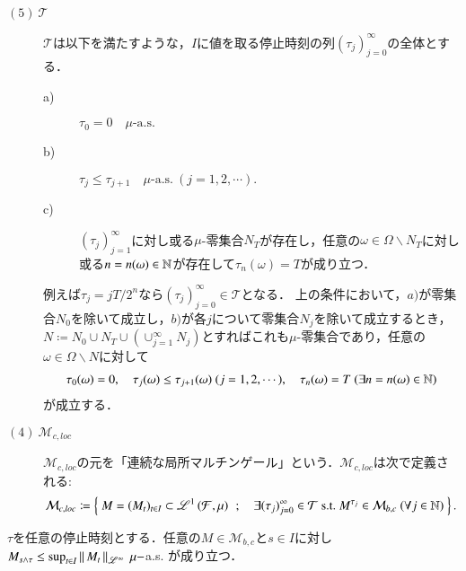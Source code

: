 \begin{description}
		\item[$\mathrm{(5)}\ \mathcal{T}$]
			$\mathcal{T}$は以下を満たすような，$I$に値を取る停止時刻の列$(\tau_j)_{j=0}^{\infty}$の全体とする．
			\begin{description}
				\item[a)] $\tau_0 = 0 \quad \mbox{$\mu$-a.s.}$
				\item[b)] $\tau_j \leq \tau_{j+1} \quad \mbox{$\mu$-a.s.}\ (j=1,2,\cdots).$
				\item[c)] $(\tau_j)_{j=1}^{\infty}$に対し或る$\mu$-零集合$N_T$が存在し，任意の$\omega \in \Omega \backslash N_T$に対し或る$n = n(\omega) \in \mathbb{N}$が存在して$\tau_n(\omega)=T$が成り立つ．
			\end{description}
			例えば$\tau_j = jT/2^n$なら$(\tau_j)_{j=0}^{\infty} \in \mathcal{T}$となる．
			上の条件において，$a)$が零集合$N_0$を除いて成立し，$b)$が各$j$について零集合$N_j$を除いて成立するとき，
			$N \coloneqq N_0 \cup N_T \cup (\cup_{j=1}^{\infty}N_j)$とすればこれも$\mu$-零集合であり，任意の$\omega \in \Omega \backslash N$に対して
			\begin{align}
				\tau_0(\omega) = 0,\quad \tau_j(\omega) \leq \tau_{j+1}(\omega)\ (j=1,2,\cdots),\quad
				\tau_n(\omega) = T\ (\exists n = n(\omega) \in \mathbb{N})
			\end{align}
			が成立する．
			
		\item[$\mathrm{(4)}\ \mathcal{M}_{c,loc}$]
			$\mathcal{M}_{c,loc}$の元を「連続な局所マルチンゲール」という．$\mathcal{M}_{c,loc}$は次で定義される:
			\begin{align}
				\mathcal{M}_{c,loc} \coloneqq 
				\left\{\ M = (M_t)_{t \in I} \subset \mathscr{L}^{1} \left(\mathcal{F},\mu\right)\ \, ; \quad \exists (\tau_j)_{j=0}^{\infty} \in \mathcal{T}\ \mathrm{s.t.}\ M^{\tau_j} \in \mathcal{M}_{b,c}\ (\forall j \in \mathbb{N})\ \right\}.
			\end{align}
	\end{description}
	
	\begin{screen}
		\begin{thm}[有界なマルチンゲールを停止時刻で停めた過程の有界性]
			$\tau$を任意の停止時刻とする．任意の$M \in \mathcal{M}_{b,c}$と$s \in I$に対し
			$M_{s \wedge \tau} \leq \operatorname*{sup}_{t \in I} \left\|\, M_t\, \right\|_{\mathscr{L}^\infty}\ \mu-$a.s.
			が成り立つ．
			\label{thm:boundedness_of_stopped_process_of_bounded_martingale}
		\end{thm}
	\end{screen}
	

